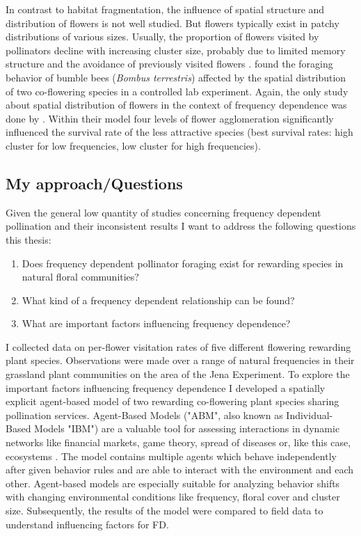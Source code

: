 In contrast to habitat fragmentation, the influence of spatial structure and distribution of flowers is not well studied. But flowers typically exist in patchy distributions of various sizes. Usually, the proportion of flowers visited by pollinators decline with increasing cluster size, probably due to limited memory structure and the avoidance of previously visited flowers \citep{goulson2000pollinators}. \cite{geslin2014effect} found the foraging behavior of bumble bees (\textit{Bombus terrestris}) affected by the spatial distribution of two co-flowering species in a controlled lab experiment. Again, the only study about spatial distribution of flowers in the context of frequency dependence was done by \cite{hanoteaux2013effects}. Within their model four levels of flower agglomeration significantly influenced the survival rate of the less attractive species (best survival rates: high cluster for low frequencies, low cluster for high frequencies). 


\subsection*{My approach/Questions}

Given the general low quantity of studies concerning frequency dependent pollination and their inconsistent results I want to address the following questions this thesis:
\begin{enumerate}
	\item Does frequency dependent pollinator foraging exist for rewarding species in natural floral communities?
	\item	What kind of a frequency dependent relationship can be found?
	\item	What are important factors influencing frequency dependence?
\end{enumerate}
I collected data on per-flower visitation rates of five different flowering rewarding plant species. Observations were made over a range of natural frequencies in their grassland plant communities on the area of the Jena Experiment. To explore the important factors influencing frequency dependence I developed a spatially explicit agent-based model of two rewarding co-flowering plant species sharing pollination services. Agent-Based Models ("ABM", also known as Individual-Based Models "IBM") are a valuable tool for assessing interactions in dynamic networks like financial markets, game theory, spread of diseases or, like this case, ecosystems \citep{deangelis2005individual}. The model contains multiple agents which behave independently after given behavior rules and are able to interact with the environment and each other. Agent-based models are especially suitable for analyzing behavior shifts with changing environmental conditions like frequency, floral cover and cluster size.
Subsequently, the results of the model were compared to field data to understand influencing factors for FD. 


